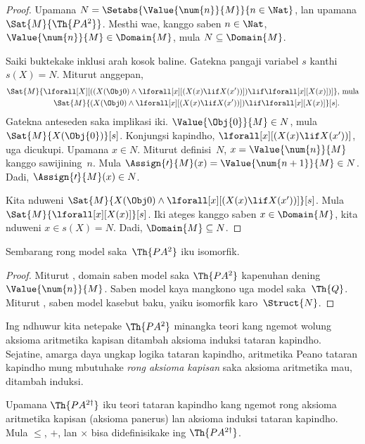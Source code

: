 \documentclass[../../../include/open-logic-section]{subfiles}
\begin{document}
\begin{proof}
Upamana $N = \Setabs{\Value{\num{n}}{M}}{n \in \Nat}$, lan
upamana $\Sat{M}{\Th{PA^2}}$. Mesthi wae, kanggo saben
$n \in \Nat$, $\Value{\num{n}}{M} \in \Domain{M}$,
mula $N \subseteq \Domain{M}$.

Saiki buktekake inklusi arah kosok baline. Gatekna
pangaji variabel $s$ kanthi $s(X) = N$. Miturut anggepan,
\begin{align*}
\Sat{M}{\lforall[X][((X(\Obj 0) \land \lforall[x][(X(x)
      \lif X(x'))]) \lif \lforall[x][X(x)])]}, & \text{ mula}\\
\Sat{M}{(X(\Obj 0) \land \lforall[x][(X(x) \lif X(x'))]) \lif
  \lforall[x][X(x)]}[s]. & 
\end{align*}
Gatekna anteseden saka implikasi iki.
$\Value{\Obj{0}}{M} \in N$, mula
$\Sat{M}{X(\Obj{0})}[s]$. Konjungsi kapindho,
$\lforall[x][(X(x) \lif X(x'))]$, uga dicukupi.
Upamana $x \in N$. Miturut definisi~$N$,
$x = \Value{\num{n}}{M}$ kanggo sawijining~$n$.
Mula $\Assign{\prime}{M}(x) = \Value{\num{n+1}}{M} \in N$.
Dadi, $\Assign{\prime}{M}(x) \in N$.

Kita nduweni
$\Sat{M}{X(\Obj 0) \land \lforall[x][(X(x) \lif X(x'))]}[s]$.
Mula $\Sat{M}{\lforall[x][X(x)]}[s]$. Iki ateges
kanggo saben $x \in \Domain{M}$, kita nduweni
$x \in s(X) = N$. Dadi, $\Domain{M} \subseteq N$.
\end{proof}

\begin{cor}
Sembarang rong model saka~$\Th{PA^2}$ iku isomorfik.
\end{cor}

\begin{proof}
Miturut , domain saben model saka
$\Th{PA^2}$ kapenuhan dening $\Value{\num{n}}{M}$.
Saben model kaya mangkono uga model saka~$\Th{Q}$.
Miturut , saben
model kasebut baku, yaiku isomorfik karo~$\Struct{N}$.
\end{proof}

Ing ndhuwur kita netepake $\Th{PA^2}$ minangka teori kang ngemot
wolung aksioma aritmetika kapisan ditambah aksioma induksi tataran
kapindho. Sejatine, amarga daya ungkap logika tataran kapindho,
aritmetika Peano tataran kapindho mung mbutuhake \emph{rong aksioma
kapisan} saka aksioma aritmetika mau, ditambah induksi.

\begin{prop}
Upamana $\Th{PA^{2\dagger}}$ iku teori tataran kapindho kang ngemot
rong aksioma aritmetika kapisan (aksioma panerus) lan aksioma
induksi tataran kapindho. Mula $\le$, $+$, lan $\times$ bisa
didefinisikake ing $\Th{PA^{2\dagger}}$.
\end{prop}
\end{document}
